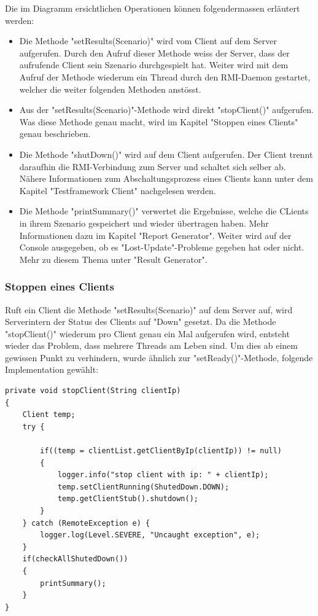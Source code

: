 Die im Diagramm ersichtlichen Operationen können folgendermassen erläutert werden:
\begin{itemize}
\item Die Methode "setResults(Scenario)" wird vom Client auf dem Server aufgerufen. Durch den Aufruf dieser Methode weiss der Server, dass der aufrufende Client sein Szenario durchgespielt hat. Weiter wird mit dem Aufruf der Methode wiederum ein Thread durch den RMI-Daemon gestartet, welcher die weiter folgenden Methoden anstösst.
\item Aus der "setResults(Scenario)"-Methode wird direkt "stopClient()" aufgerufen. Was diese Methode genau macht, wird im Kapitel "Stoppen eines Clients" genau beschrieben.
\item Die Methode "shutDown()" wird auf dem Client aufgerufen. Der Client trennt daraufhin die RMI-Verbindung zum Server und schaltet sich selber ab. Nähere Informationen zum Abschaltungsprozess eines Clients kann unter dem Kapitel "Testframework Client" nachgelesen werden.
\item Die Methode "printSummary()" verwertet die Ergebnisse, welche die CLients in ihrem Szenario gespeichert und wieder übertragen haben. Mehr Informationen dazu im Kapitel "Report Generator". Weiter wird auf der Console ausgegeben, ob es "Lost-Update"-Probleme gegeben hat oder nicht. Mehr zu diesem Thema unter "Result Generator".
\end{itemize}

\subsubsection{Stoppen eines Clients}
\label{sec:stopClient}
Ruft ein Client die Methode "setResults(Scenario)" auf dem Server auf, wird Serverintern der Status des Clients auf "Down" gesetzt. Da die Methode "stopClient()" wiederum pro Client genau ein Mal aufgerufen wird, entsteht wieder das Problem, dass mehrere Threads am Leben sind. Um dies ab einem gewissen Punkt zu verhindern, wurde ähnlich zur "setReady()"-Methode, folgende Implementation gewählt:
\begin{lstlisting}
private void stopClient(String clientIp)
{
	Client temp;
	try {
		
		if((temp = clientList.getClientByIp(clientIp)) != null)
		{
			logger.info("stop client with ip: " + clientIp);
			temp.setClientRunning(ShutedDown.DOWN);
			temp.getClientStub().shutdown();
		}
	} catch (RemoteException e) {
		logger.log(Level.SEVERE, "Uncaught exception", e);
	}
	if(checkAllShutedDown())
	{
		printSummary();
	}
}
\end{lstlisting}

